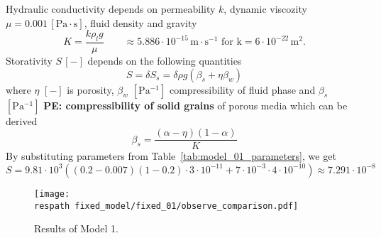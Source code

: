 \documentclass{article}
\def\unit#1{\mathrm{#1}}
\def\bunit#1{[\mathrm{#1}]}
\newcommand{\pe}[1]{{\color{red} \textbf{PE: #1}}}
\newcommand{\respath}{results/}
\newcommand{\eq}[1]{\begin{equation}{#1}\end{equation}}
\newcommand\tabref[1]{Table~\ref{#1}}
\begin{document}
Hydraulic conductivity depends on permeability $k$, dynamic viscozity $\mu = 0.001\,\bunit{Pa\cdot s}$, fluid density and gravity
\eq{K = \frac{k\rho_l g}{\mu}
\qquad \approx 5.886\cdot10^{-15}\,\unit{m\cdot s^{-1} \mbox{ for } k = 6\cdot10^{-22}\,\unit{m^2}}.
}
%
Storativity $S\,\bunit{-}$ depends on the following quantities
\eq{S = \delta S_s = \delta \rho g \left(\beta_s + \eta \beta_w\right)}
where $\eta$ $\bunit{-}$ is porosity, $\beta_w$ $\bunit{Pa^{-1}}$ compressibility of fluid phase and
$\beta_s$ $\bunit{Pa^{-1}}$ \pe{compressibility of solid grains} of porous media which can be derived
\eq{ \beta_s = \frac{(\alpha-\eta)(1-\alpha)}{K} }
%
By substituting parameters from \tabref{tab:model_01_parameters}, we get
\eq{ S = 9.81\cdot10^3\left((0.2-0.007)(1-0.2)\cdot 3\cdot10^{-11}
+ 7\cdot10^{-3} \cdot 4\cdot10^{-10}\right) \approx 7.291\cdot10^{-8}}

\begin{figure}[!htb]
    \centering
    \texttt{[image: \\respath fixed\_model/fixed\_01/observe\_comparison.pdf]}
    \caption{Results of Model 1.}
    \label{fig:model_01_observe_pressure}
\end{figure}

\end{document}

